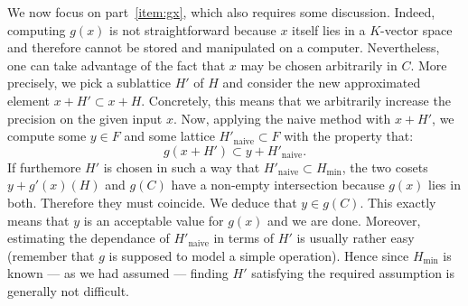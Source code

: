 \documentclass{article}
\begin{document}
We now focus on part~\eqref{item:gx}, which also requires some 
discussion. Indeed, computing $g(x)$ is not straightforward because $x$ 
itself lies in a $K$-vector space and therefore cannot be stored and 
manipulated on a computer. Nevertheless, one can take advantage of the 
fact that $x$ may be chosen arbitrarily in $C$. More precisely, we pick 
a sublattice $H'$ of $H$ and consider the new approximated element $x+H' 
\subset x+H$. Concretely, this means that we arbitrarily increase the 
precision on the given input $x$. Now, applying the naive method with 
$x+H'$, we compute some $y \in F$ and some lattice $H'_{\text{naive}} 
\subset F$ with the property that:
$$g(x+H') \subset y + H'_{\text{naive}}.$$
If furthemore $H'$ is chosen in such a way that $H'_{\text{naive}} 
\subset H_\min$, the two cosets $y + g'(x)(H)$ and $g(C)$ have a 
non-empty intersection because $g(x)$ lies in both. Therefore they 
must coincide. We deduce that $y \in g(C)$. This exactly means that
$y$ is an acceptable value for $g(x)$ and we are done.
Moreover, estimating the dependance of $H'_{\text{naive}}$ in terms 
of $H'$ is usually rather easy (remember that $g$ is supposed to model
a simple operation). Hence since $H_\min$ is known --- as
we had assumed --- finding $H'$ satisfying the required assumption is
generally not difficult. 
\end{document}
